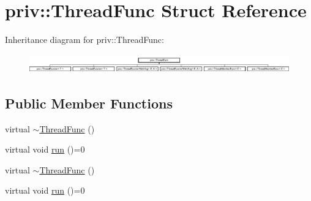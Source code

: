 \hypertarget{structpriv_1_1_thread_func}{\section{priv\-:\-:Thread\-Func Struct Reference}
\label{structpriv_1_1_thread_func}
}
Inheritance diagram for priv\-:\-:Thread\-Func\-:\begin{figure}[H]
\begin{center}
\leavevmode
\includegraphics[height=0.822320cm]{structpriv_1_1_thread_func}
\end{center}
\end{figure}
\subsection*{Public Member Functions}
\begin{DoxyCompactItemize}
\item 
virtual \hyperlink{structpriv_1_1_thread_func_a085d7741b00ad5c8610cc26739d423cb}{$\sim$\-Thread\-Func} ()
\item 
virtual void \hyperlink{structpriv_1_1_thread_func_ab5465e714ca4aa92a09bf5e24410a5c3}{run} ()=0
\item 
virtual \hyperlink{structpriv_1_1_thread_func_a085d7741b00ad5c8610cc26739d423cb}{$\sim$\-Thread\-Func} ()
\item 
virtual void \hyperlink{structpriv_1_1_thread_func_ab5465e714ca4aa92a09bf5e24410a5c3}{run} ()=0
\end{DoxyCompactItemize}


